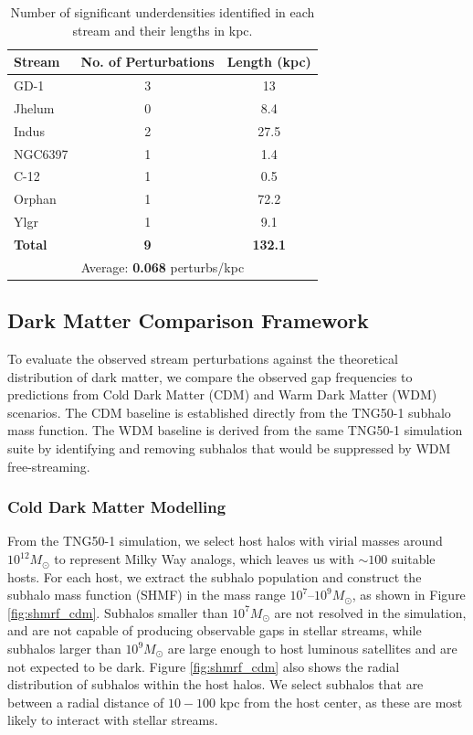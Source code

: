 \documentclass[10pt,onecolumn]{article}
\begin{document}
\begin{table}[h]
    \centering
    \renewcommand{\arraystretch}{1.5} %
    \begin{tabular}{|p{4cm}|c|c|}
        \hline
        \centering \textbf{Stream} & \textbf{No. of Perturbations} & \textbf{Length (kpc)} \\ \hline
        \centering GD-1 & 3 & 13 \\ \hline
        \centering Jhelum & 0 & 8.4 \\ \hline
        \centering Indus & 2 & 27.5 \\ \hline
        \centering NGC6397 & 1 & 1.4 \\ \hline
        \centering C-12 & 1 & 0.5 \\ \hline
        \centering Orphan & 1 & 72.2 \\ \hline
        \centering Ylgr & 1 & 9.1 \\ \hline
        \centering \textbf{Total} & \textbf{9} & \textbf{132.1} \\ \hline
        \multicolumn{3}{|c|}{Average: \textbf{0.068} perturbs/kpc} \\ \hline
    \end{tabular}
    \caption{Number of significant underdensities identified in each stream and their lengths in kpc.}
    \label{tab:stream_perturbations}
\end{table}

\subsection{Dark Matter Comparison Framework}
To evaluate the observed stream perturbations against the theoretical distribution of dark matter, we compare the observed gap frequencies to predictions from Cold Dark Matter (CDM) and Warm Dark Matter (WDM) scenarios. The CDM baseline is established directly from the TNG50-1 subhalo mass function. The WDM baseline is derived from the same TNG50-1 simulation suite by identifying and removing subhalos that would be suppressed by WDM free-streaming.

\subsubsection*{Cold Dark Matter Modelling}

From the TNG50-1 simulation, we select host halos with virial masses around $10^{12} M_{\odot}$ to represent Milky Way analogs, which leaves us with $\sim 100$ suitable hosts. For each host, we extract the subhalo population and construct the subhalo mass function (SHMF) in the mass range $10^7$--$10^9 M_{\odot}$, as shown in Figure \ref{fig:shmrf_cdm}. Subhalos smaller than $10^7 M_{\odot}$ are not resolved in the simulation, and are not capable of producing observable gaps in stellar streams, while subhalos larger than $10^9 M_{\odot}$ are large enough to host luminous satellites and are not expected to be dark. Figure \ref{fig:shmrf_cdm} also shows the radial distribution of subhalos within the host halos. We select subhalos that are between a radial distance of $10-100$ kpc from the host center, as these are most likely to interact with stellar streams.
\end{document}
